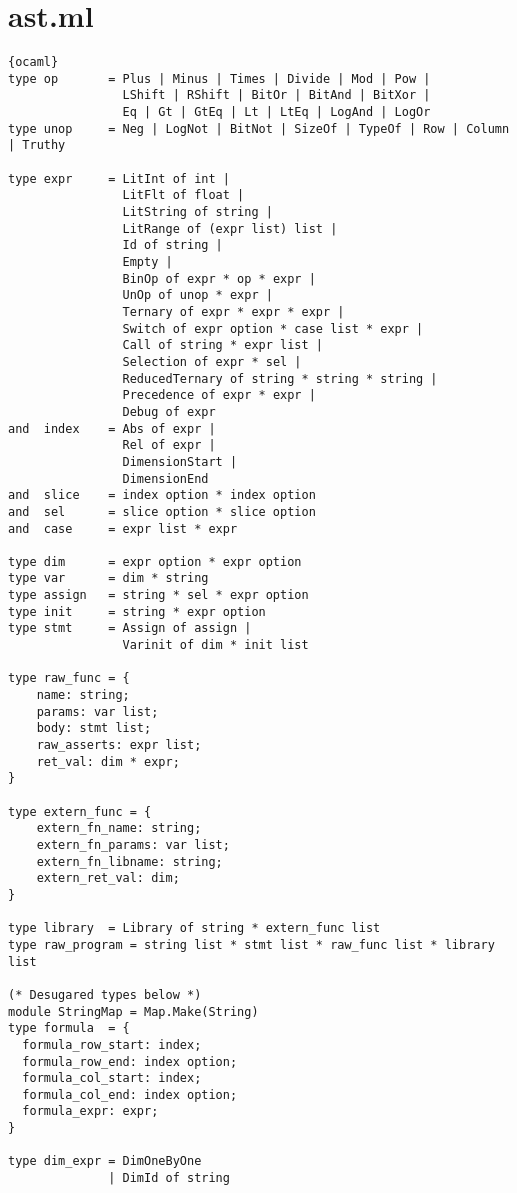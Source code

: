 \section{ast.ml}
\begin{lstlisting}{ocaml}
type op       = Plus | Minus | Times | Divide | Mod | Pow |
                LShift | RShift | BitOr | BitAnd | BitXor |
                Eq | Gt | GtEq | Lt | LtEq | LogAnd | LogOr
type unop     = Neg | LogNot | BitNot | SizeOf | TypeOf | Row | Column | Truthy

type expr     = LitInt of int |
                LitFlt of float |
                LitString of string |
                LitRange of (expr list) list |
                Id of string |
                Empty |
                BinOp of expr * op * expr |
                UnOp of unop * expr |
                Ternary of expr * expr * expr |
                Switch of expr option * case list * expr |
                Call of string * expr list |
                Selection of expr * sel |
                ReducedTernary of string * string * string |
                Precedence of expr * expr |
                Debug of expr
and  index    = Abs of expr |
                Rel of expr |
                DimensionStart |
                DimensionEnd
and  slice    = index option * index option
and  sel      = slice option * slice option
and  case     = expr list * expr

type dim      = expr option * expr option
type var      = dim * string
type assign   = string * sel * expr option
type init     = string * expr option
type stmt     = Assign of assign |
                Varinit of dim * init list

type raw_func = {
    name: string;
    params: var list;
    body: stmt list;
    raw_asserts: expr list;
    ret_val: dim * expr;
}

type extern_func = {
    extern_fn_name: string;
    extern_fn_params: var list;
    extern_fn_libname: string;
    extern_ret_val: dim;
}

type library  = Library of string * extern_func list
type raw_program = string list * stmt list * raw_func list * library list

(* Desugared types below *)
module StringMap = Map.Make(String)
type formula  = {
  formula_row_start: index;
  formula_row_end: index option;
  formula_col_start: index;
  formula_col_end: index option;
  formula_expr: expr;
}

type dim_expr = DimOneByOne
              | DimId of string


\end{lstlisting}
